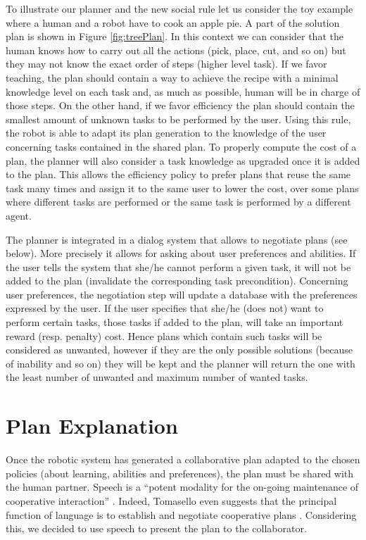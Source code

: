 To illustrate our planner and the new social rule let us consider the toy example where a human and a robot have to cook an apple pie. A part of the solution plan is shown in Figure \ref{fig:treePlan}. In this context we can consider that the human knows how to carry out all the actions (pick, place, cut, and so on) but they may not know the exact order of steps (higher level task). If we favor teaching, the plan should contain a way to achieve the recipe with a minimal knowledge level on each task and, as much as possible, human will be in charge of those steps. On the other hand, if we favor efficiency the plan should contain the smallest amount of unknown tasks to be performed by the user.
Using this rule, the robot is able to adapt its plan generation to the knowledge of the user concerning tasks contained in the shared plan.
To properly compute the cost of a plan, the planner will also consider a task knowledge as upgraded once it is added to the plan. This allows the efficiency policy to prefer plans that reuse the same task many times and assign it to the same user to lower the cost, over some plans where different tasks are performed or the same task is performed by a different agent.

The planner is integrated in a dialog system that allows to negotiate plans (see below). More precisely it allows for asking about user preferences and abilities. If the user tells the system that she/he cannot perform a given task, it will not be added to the plan (invalidate the corresponding task precondition).
Concerning user preferences, the negotiation step will update a database with the preferences expressed by the user. If the user specifies that she/he (does not) want to perform certain tasks, those tasks if added to the plan, will take an important reward (resp. penalty) cost. Hence plans which contain such tasks will be considered as unwanted, however if they are the only possible solutions (because of inability and so on) they will be kept and the planner will return the one with the least number of unwanted and maximum number of wanted tasks.


\section{Plan Explanation}
Once the robotic system has generated a collaborative plan adapted to the chosen policies (about learning, abilities and preferences), the plan must be shared with the human partner.
Speech is a ``potent modality for the on-going maintenance of cooperative interaction'' \cite{Lallee2013}. Indeed, Tomasello even suggests that the principal function of language is to establish and negotiate cooperative plans \cite{tomasello2005}.
Considering this, we decided to use speech to present the plan to the collaborator.


